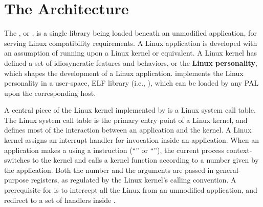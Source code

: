 \section{The \thelibos{} Architecture}


The \graphene{} \libos{}, or \thelibos{},
is a single library being loaded beneath an unmodified application,
for serving Linux compatibility requirements.
A Linux application
is developed with an assumption of running upon a Linux kernel or equivalent.
A Linux kernel has defined a set of idiosyncratic features and behaviors,
or the {\bf Linux personality},
which shapes the development of a Linux application.
\thelibos{} implements the Linux personality in a user-space, ELF library (i.e., ),
which can be loaded by any PAL upon the corresponding host.


A central piece of the Linux kernel implemented by \thelibos{} is a Linux system call table.
The Linux system call table is
the primary entry point of a Linux kernel,
and defines most of the interaction between an application and the kernel.
A Linux kernel assigns
an interrupt handler for \linuxapi{} invocation inside an application.
When an application makes a \linuxapi{} using a \graphenearch{} instruction (``'' or ``''),
the current process
context-switches to the kernel
and calls a kernel function according to a \linuxapi{} number
given by the application.
Both the \linuxapi{} number and the arguments
are passed in \graphenearch{} general-purpose registers, as regulated by the Linux kernel's calling convention.
A prerequisite for \thelibos{}
is to intercept all the Linux \linuxapis{} from an unmodified application,
and redirect %
to  a set of \linuxapi{} handlers inside \thelibos{}.


